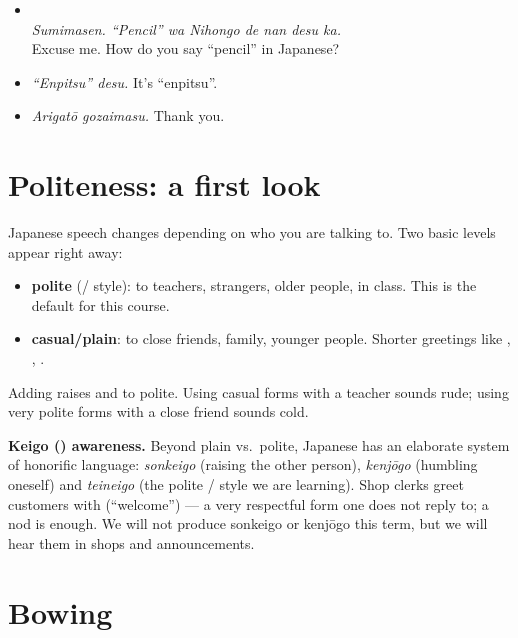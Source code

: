 \begin{example}
\leavevmode
\begin{itemize}
  \item[A:] \\
        \emph{Sumimasen. ``Pencil'' wa Nihongo de nan desu ka.}\\
        Excuse me. How do you say ``pencil'' in Japanese?
  \item[B:]  \emph{``Enpitsu'' desu.} It's ``enpitsu''.
  \item[A:]  \emph{Arigatō gozaimasu.} Thank you.
\end{itemize}
\end{example}

\section{Politeness: a first look}

Japanese speech changes depending on who you are talking to. Two basic levels appear
right away:
\begin{itemize}
  \item \textbf{polite} (/ style): to teachers, strangers, older people,
        in class. This is the default for this course.
  \item \textbf{casual/plain}: to close friends, family, younger people. Shorter greetings
        like , , .
\end{itemize}
Adding  raises  and  to polite. Using
casual forms with a teacher sounds rude; using very polite forms with a close friend
sounds cold.

\begin{aside}
\textbf{Keigo () awareness.} Beyond plain vs.\ polite, Japanese has an
elaborate system of honorific language: \emph{sonkeigo} (raising the other person),
\emph{kenjōgo} (humbling oneself) and \emph{teineigo} (the polite /
style we are learning). Shop clerks greet customers with 
(``welcome'') — a very respectful form one does not reply to; a nod is enough. We will
not produce sonkeigo or kenjōgo this term, but we will hear them in shops and
announcements.
\end{aside}

\section{Bowing}


